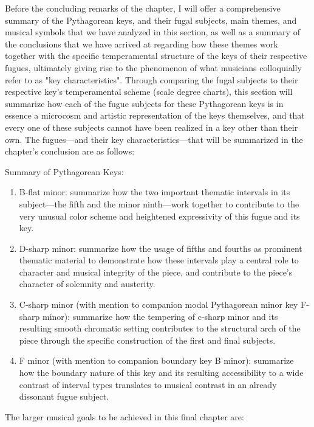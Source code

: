 Before the concluding remarks of the chapter, I will offer a
comprehensive summary of the Pythagorean keys, and their fugal subjects,
main themes, and musical symbols that we have analyzed in this section,
as well as a summary of the conclusions that we have arrived at
regarding how these themes work together with the specific temperamental
structure of the keys of their respective fugues, ultimately giving rise
to the phenomenon of what musicians colloquially refer to as "key
characteristics". Through comparing the fugal subjects to their
respective key's temperamental scheme (scale degree charts), this
section will summarize how each of the fugue subjects for these
Pythagorean keys is in essence a microcosm and artistic representation
of the keys themselves, and that every one of these subjects cannot have
been realized in a key other than their own. The fugues---and their
key characteristics---that will be summarized in the chapter's
conclusion are as follows:

Summary of Pythagorean Keys:

\begin{enumerate}
\def\labelenumi{\arabic{enumi}.}
\tightlist
\item
  B-flat minor: summarize how the two important thematic intervals in
  its subject---the fifth and the minor ninth---work together to
  contribute to the very unusual color scheme and heightened
  expressivity of this fugue and its key.
\item
  D-sharp minor: summarize how the usage of fifths and fourths as
  prominent thematic material to demonstrate how these intervals play a
  central role to character and musical integrity of the piece, and
  contribute to the piece's character of solemnity and austerity.
\item
  C-sharp minor (with mention to companion modal Pythagorean minor key
  F-sharp minor): summarize how the tempering of c-sharp minor and its
  resulting smooth chromatic setting contributes to the structural arch
  of the piece through the specific construction of the first and final
  subjects.
\item
  F minor (with mention to companion boundary key B minor): summarize
  how the boundary nature of this key and its resulting accessibility to
  a wide contrast of interval types translates to musical contrast in an
  already dissonant fugue subject.
\end{enumerate}

The larger musical goals to be achieved in this final chapter are:

